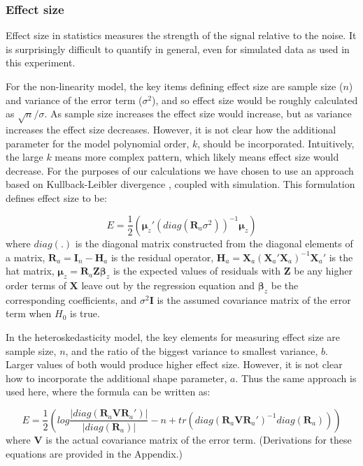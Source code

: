 \documentclass[]{interact}
\theoremstyle{plain}%
\theoremstyle{definition}
\theoremstyle{remark}
\begin{document}
\hypertarget{effect-size}{%
\subsubsection{Effect size}\label{effect-size}}

Effect size in statistics measures the strength of the signal relative
to the noise. It is surprisingly difficult to quantify in general, even
for simulated data as used in this experiment.

For the non-linearity model, the key items defining effect size are
sample size (\(n\)) and variance of the error term (\(\sigma^2\)), and
so effect size would be roughly calculated as \(\sqrt{n}/{\sigma}\). As
sample size increases the effect size would increase, but as variance
increases the effect size decreases. However, it is not clear how the
additional parameter for the model polynomial order, \(k\), should be
incorporated. Intuitively, the large \(k\) means more complex pattern,
which likely means effect size would decrease. For the purposes of our
calculations we have chosen to use an approach based on Kullback-Leibler
divergence \citep{kullback1951information}, coupled with simulation.
This formulation defines effect size to be:

\[E = \frac{1}{2}\left(\boldsymbol{\mu}_z'(diag(\boldsymbol{R}_a\sigma^2))^{-1}\boldsymbol{\mu}_z\right)\]
\noindent where \(diag(.)\) is the diagonal matrix constructed from the
diagonal elements of a matrix,
\(\boldsymbol{R}_a = \boldsymbol{I}_n - \boldsymbol{H}_a\) is the
residual operator,
\(\boldsymbol{H}_a = \boldsymbol{X}_a(\boldsymbol{X}_a'\boldsymbol{X}_a)^{-1}\boldsymbol{X}_a'\)
is the hat matrix,
\(\boldsymbol{\mu}_z = \boldsymbol{R}_a\boldsymbol{Z}\boldsymbol{\beta}_z\)
is the expected values of residuals with \(\boldsymbol{Z}\) be any
higher order terms of \(\boldsymbol{X}\) leave out by the regression
equation and \(\boldsymbol{\beta}_z\) be the corresponding coefficients,
and \(\sigma^2\boldsymbol{I}\) is the assumed covariance matrix of the
error term when \(H_0\) is true.

In the heteroskedasticity model, the key elements for measuring effect
size are sample size, \(n\), and the ratio of the biggest variance to
smallest variance, \(b\). Larger values of both would produce higher
effect size. However, it is not clear how to incorporate the additional
shape parameter, \(a\). Thus the same approach is used here, where the
formula can be written as:

\[E = \frac{1}{2}\left(log\frac{|diag(\boldsymbol{R}_a\boldsymbol{V}\boldsymbol{R}_a')|}{|diag(\boldsymbol{R}_a)|} - n + tr(diag(\boldsymbol{R}_a\boldsymbol{V}\boldsymbol{R}_a')^{-1}diag(\boldsymbol{R}_a))\right)\]
\noindent where \(\boldsymbol{V}\) is the actual covariance matrix of
the error term. (Derivations for these equations are provided in the
Appendix.)
\end{document}

